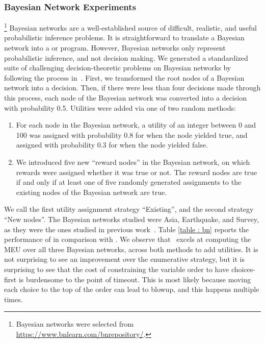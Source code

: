 \subsubsection{Bayesian Network Experiments}\footnote{Bayesian networks were selected
from \url{https://www.bnlearn.com/bnrepository/}.}
\label{sec:bn-eval}
  Bayesian networks are a well-established source of difficult, realistic,
  and useful probabilistic inference problems. It is straightforward to
  translate a Bayesian network into a \dappl{} or \problog{} program.
  However, Bayesian networks only represent probabilistic inference, and not decision making.
  We generated a standardized suite of challenging decision-theoretic problems on
  Bayesian networks by following the process in~\citet{derkinderen2020algebraic}.
  First, we transformed the root nodes of a Bayesian network into a decision.
  Then, if there were less than four decisions made through this process,
  each node of the Bayesian network was converted into a decision
  with probability 0.5. Utilities were added via one of two random methods:
  \begin{enumerate}[leftmargin=*]
    \item For each node in the Bayesian network, a utility of an integer
    between 0 and 100 was assigned with probability 0.8 for when the node yielded true,
    and assigned with probability 0.3 for when the node yielded false.
    \item We introduced five new ``reward nodes'' in the Bayesian network,
    on which rewards were assigned whether it was true or not.
    The reward nodes are true if and only if at least one of five randomly generated
    assignments to the existing nodes of the Bayesian network are true.
  \end{enumerate}
  We call the first utility assignment strategy ``Existing'',
  and the second strategy ``New nodes''.
  The Bayesian networks studied were Asia, Earthquake, and Survey,
  as they were the ones studied in previous work~\citep{derkinderen2020algebraic}.
Table \ref{table : bn} reports the performance of \dappl{} in comparison with
\dtproblog{}. We observe that \dappl~excels at computing the MEU over all three
Bayesian networks, across both methods to add utilities.
It is not surprising to
see an improvement over the enumerative strategy, but it is surprising to see that
the cost of
constraining the variable order to have choices-first is burdensome to the point
of timeout.
This is most likely because moving each choice to the
top of the order can lead to blowup, and this happens multiple times.

